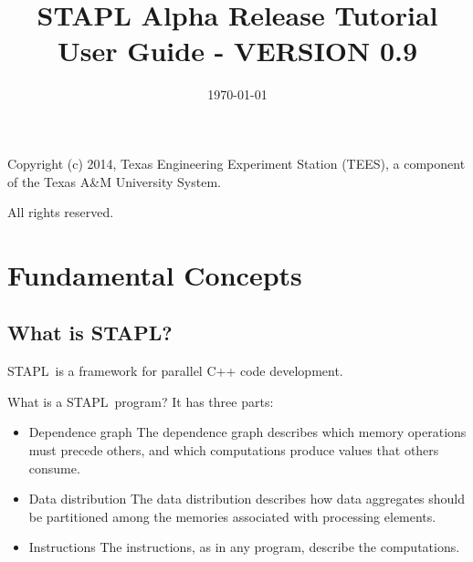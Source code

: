 \documentclass{report}
\begin{document}
\title{STAPL Alpha Release Tutorial User Guide - VERSION 0.9}
\date{\today}
\maketitle

\newenvironment{hashitemize}{%
  \renewcommand{\labelitemi}{\bfseries \#\#}%
        \begin{itemize}}{\end{itemize}}

\newcommand{\stapl}{{\sc STAPL}}
\newcommand{\stl}{{\sc STL}}
\newcommand{\pview}{{\sc PVIEW}}
\newcommand{\pviews}{{\sc PVIEWS}}
\newcommand{\pcontainer}{{\sc PCONTAINER}}
\newcommand{\pcontainers}{{\sc PCONTAINERS}}

\pagestyle{myheadings}
\renewcommand{\chaptermark}[1]{
              \markboth{*** DRAFT 0.9 *** \chaptername\ \thechapter. #1 } {} }
\renewcommand{\sectionmark}[1]{
              \markright{*** DRAFT 0.9 *** \thesection. #1 } {}}


\vspace*{8cm}
\begin{center}
Copyright (c) 2014, Texas Engineering Experiment Station (TEES), a
component of the Texas A\&M University System.

All rights reserved.
\end{center}
\pagebreak


\chapter{Fundamental Concepts}


\section{What is \stapl?}

\stapl\ is a framework for parallel C++ code development.

What is a \stapl\ program?  It has three parts:
\begin{itemize}
\item Dependence graph
\newline
The dependence graph describes which memory operations must precede others,
and which computations produce values that others consume.
\item Data distribution
\newline
The data distribution describes how data aggregates should be partitioned
among the memories associated with processing elements.
\item Instructions
\newline
The instructions, as in any program, describe the computations.
\end{itemize}
\end{document}
